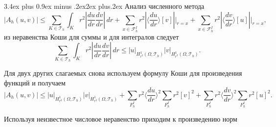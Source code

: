 \documentclass[a4paper,12pt, russian, titlepage]{article} %
\makeatletter
\numberwithin{equation}{section}
\renewcommand{\vec}[1]{\mathbf{#1}}
\renewcommand{\section}{\@startsection{section}{1}{1cm}%
{3.4ex plus 0.9ex minus .2ex}{2ex plus.2ex}%
{\normalfont\large\bfseries}}
\numberwithin{theorem}{subsection}
\numberwithin{definition}{subsection}
\numberwithin{proposition}{subsection}
\makeatother
\begin{document}
\section{Анализ численного метода}
\begin{equation}
|A_h(u, v)| \le \sum_{K \in \mathcal{T}_h} \int_K r^2|\frac{du}{dr} \frac{dv}{dr}| \, dr + \sum_{x \in \mathcal{F}^I_h} r^2 |\langle \frac{du}{dr}\rangle [v]| \big|_{r=x}+ \sum_{x \in \mathcal{F}^I_h} r^2 |\langle \frac{dv}{dr}\rangle [u] | \big|_{r=x},
\end{equation}
из неравенства Коши для суммы и для интегралов следует
\begin{equation}
\sum_{K \in \mathcal{T}_h} \int_K r^2|\frac{du}{dr}\frac{dv}{dr}| \, dr \le |u|_{H^1_{r^2}(\Omega, \mathcal{T}_h)} |v|_{H^1_{r^2}(\Omega, \mathcal{T}_h)}.
\end{equation} \par
Для двух других слагаемых снова используем формулу Коши для произведения функций и получаем
\begin{equation}
|A_h(u, v)| \le |u|_{H^1_{r^2}(\Omega, \mathcal{T}_h)} |v|_{H^1_{r^2}(\Omega, \mathcal{T}_h)} + \sum_{F^I_h} r^2  \langle \frac{du}{dr}\rangle^2 \sum_{F^I_h} r^2 [v]^2 + \sum_{F^I_h} r^2  \langle \frac{dv}{dr}\rangle^2 \sum_{F^I_h} r^2 [u]^2.
\end{equation}\par
Используя {\color{red}неизвестное числовое  неравенство} приходим к произведению норм
\end{document}
